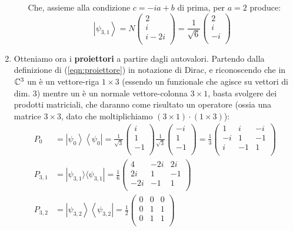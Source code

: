 \begin{enumerate}
\begin{itemize}
\[	\]
	Che, assieme alla condizione $c=-ia+b$ di prima, per $a=2$ produce:
	\[
	\left|\psi_{3,1}\right\rangle=N\left(\begin{matrix}2\\i\\i-2i\\\end{matrix}\right)=\frac{1}{\sqrt6}\left(\begin{matrix}2\\i\\-i\\\end{matrix}\right)
	\]
\end{itemize}
\item Otteniamo ora i \textbf{proiettori} a partire dagli autovalori. Partendo dalla definizione di (\ref{eqn:proiettore}) in notazione di Dirac, e riconoscendo che in $\mathbb{C}^3$ un  è un vettore-riga $1\times 3$ (essendo un funzionale che agisce su vettori di dim. 3) mentre un  è un normale vettore-colonna $3\times 1$, basta svolgere dei prodotti matriciali, che daranno come risultato un operatore (ossia una matrice $3\times 3$, dato che moltiplichiamo $(3\times 1) \cdot (1\times 3)$):
\begin{align*}
	P_0&=\left|\psi_0\right\rangle\left\langle\psi_0\right|=\frac{1}{\sqrt3}\left(\begin{matrix}i\\1\\-1\\\end{matrix}\right)\frac{1}{\sqrt3}\left(\begin{matrix}-i\\1\\-1\\\end{matrix}\right)=\frac{1}{3}\left(\begin{matrix}1&i&-i\\-i&1&-1\\i&-1&1\\\end{matrix}\right)\\
	P_{3,1}&=|\psi_{3,1}\rangle \langle \psi_{3,1}|=\frac{1}{6}\left(\begin{matrix}4&-2i&2i\\2i&1&-1\\-2i&-1&1\\\end{matrix}\right)\\
	P_{3,2}&=\left|\psi_{3,2}\right\rangle\left\langle\psi_{3,2}\right|=\frac{1}{2}\left(\begin{matrix}0&0&0\\0&1&1\\0&1&1\\\end{matrix}\right)

\end{align*}
\end{enumerate}
